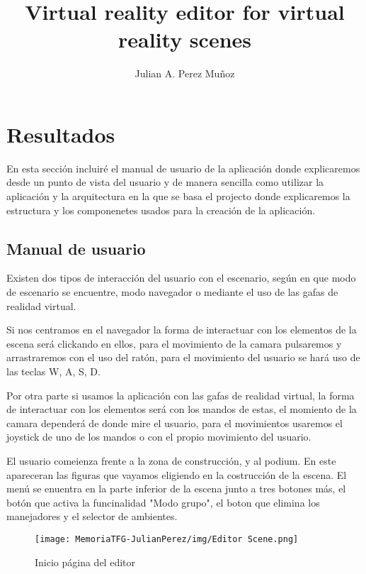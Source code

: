 \documentclass[a4paper, 12pt]{book}
\title{Virtual reality editor for virtual reality scenes}
\author{Julian A. Perez Muñoz}
\begin{document}

\cleardoublepage
\chapter{Resultados}

En esta sección incluiré el manual de usuario de la aplicación donde explicaremos desde un punto de vista del usuario y de  manera sencilla como utilizar la aplicación y la arquitectura en la que se basa el projecto donde explicaremos la estructura y los componenetes usados para la creación de la aplicación.

\section{Manual de usuario} 
\label{sec:manual de usuario}

Existen dos tipos de interacción del usuario con el escenario, según en que modo de escenario se encuentre, modo navegador o mediante el uso de las gafas de realidad virtual.

Si nos centramos en el navegador la forma de interactuar con los elementos de la escena será clickando en ellos, para el movimiento de la camara pulsaremos y arrastraremos con el uso del ratón, para el movimiento del usuario se hará uso de las teclas W, A, S, D.

Por otra parte si usamos la aplicación con las gafas de realidad virtual, la forma de interactuar con los elementos será con los mandos de estas, el momiento de la camara dependerá de donde mire el usuario, para el movimientos usaremos el joystick de uno de los mandos o con el propio movimiento del usuario.

El usuario comeienza frente a la zona de construcción, y al podium. En este apareceran las figuras que vayamos eligiendo en la costrucción de la escena. El menú se enuentra en la parte inferior de la escena junto a tres botones más, el botón que activa la funcinalidad "Modo grupo", el boton que elimina los manejadores y el selector de ambientes.

\begin{figure}[H]
  \centering
  \texttt{[image: MemoriaTFG-JulianPerez/img/Editor Scene.png]}
  \caption{Inicio página del editor}\label{home}
\end{figure}
\end{document}
